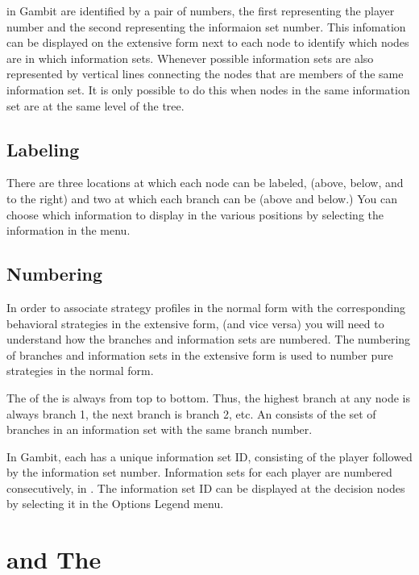  in Gambit are identified by a 
pair of numbers, the first representing the player number and the 
second representing the informaion set number.  This infomation 
can be displayed on the extensive form next to each node to identify 
which nodes are in which information sets.  
Whenever possible information sets are also represented 
by vertical lines connecting the nodes that are members of the same information set.  
It is only possible to do this when nodes 
in the same information set are at the same level of the tree.  

\subsection{Labeling}
There are three locations at which each node can be labeled, (above, 
below, and to the right) and two at which each branch can be 
 (above and below.) You can choose which information to display 
in the various positions by selecting the information in the   menu.  

\subsection{Numbering}\label{infosetnumbering}
In order  to associate strategy profiles in the 
normal form with the corresponding behavioral strategies in the extensive 
form, (and vice versa) you will need to understand how the branches and 
information sets are numbered.  The numbering of branches and information 
sets in the extensive form  is used to number pure strategies in the normal form.  

The  of the  is always
from top to bottom.  Thus, the highest branch at any node is always branch
1, the next branch is branch 2, etc. An  consists of 
the set of branches in an information set with the same branch number.  

In Gambit, each  has a unique 
information set ID, consisting of the player followed by the information 
set number.  Information sets for each player are numbered consecutively, 
in .  
The information set ID can be displayed at the decision nodes by selecting 
it in the Options Legend menu.  

\section{ and The }

